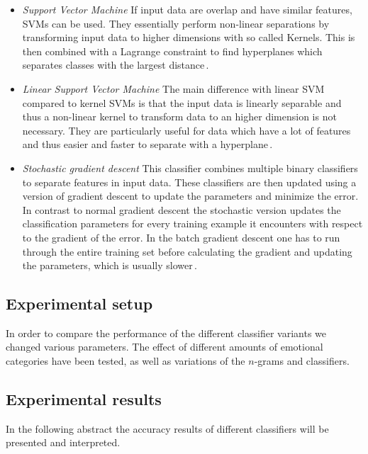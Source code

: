 \documentclass[a4paper,12pt]{article}
\begin{document}
\begin{itemize}
\item \textit{Support Vector Machine}
If input data are overlap and have similar features, SVMs can be used. They essentially perform non-linear separations by transforming input data to higher dimensions with so called Kernels. This is then combined with a Lagrange constraint to find hyperplanes which separates classes with the largest distance\,\cite{SVM}. 

\item \textit{Linear Support Vector Machine}
The main difference with linear SVM compared to kernel SVMs is that the  input data is linearly separable and thus a non-linear kernel to transform data to an higher dimension is not necessary. They are particularly useful for data which have a lot of features and thus easier and faster to separate with a hyperplane\,\cite{SVM}.

\item \textit{Stochastic gradient descent}
This classifier combines multiple binary classifiers to separate features in input data. These classifiers are then updated using a version of gradient descent to update the parameters and minimize the error. In contrast to normal gradient descent the stochastic version updates the classification parameters for every training example it encounters with respect to the gradient of the error. In the batch gradient descent one has to run through the entire training set before calculating the gradient and updating the parameters, which is usually slower\,\cite{SGD}. 

\end{itemize}


\subsection{Experimental setup}
In order to compare the performance of the different classifier variants we changed various parameters. The effect of different amounts of emotional categories have been tested, as well as variations of the $n$-grams and classifiers.


\subsection{Experimental results}

In the following abstract the accuracy results of different classifiers will be presented and interpreted. 
\end{document}
